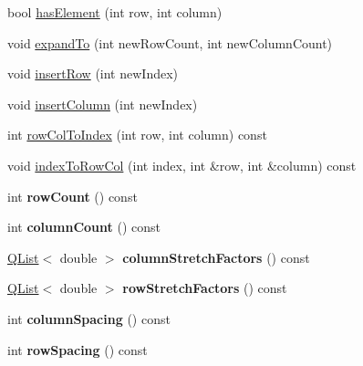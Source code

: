 \begin{DoxyCompactItemize}
\item 
bool \hyperlink{class_q_c_p_layout_grid_ab0cf4f7edc9414a3bfaddac0f46dc0a0}{has\+Element} (int row, int column)
\item 
void \hyperlink{class_q_c_p_layout_grid_a886c0dcbabd51a45da399e044552b685}{expand\+To} (int new\+Row\+Count, int new\+Column\+Count)
\item 
void \hyperlink{class_q_c_p_layout_grid_a48af3dd7c3a653d9c3d7dd99bd02e838}{insert\+Row} (int new\+Index)
\item 
void \hyperlink{class_q_c_p_layout_grid_a1e880a321dbe8b43b471ccd764433dc4}{insert\+Column} (int new\+Index)
\item 
int \hyperlink{class_q_c_p_layout_grid_a3cefc5fe391722b653958ab6e984c706}{row\+Col\+To\+Index} (int row, int column) const 
\item 
void \hyperlink{class_q_c_p_layout_grid_a964d4e6284af1cfc4da0292c2e0b5ac0}{index\+To\+Row\+Col} (int index, int \&row, int \&column) const 
\item 
int {\bfseries row\+Count} () const \hypertarget{class_q_c_p_layout_grid_af8e6c7a05864ebe610c87756c7b9079c}{}\label{class_q_c_p_layout_grid_af8e6c7a05864ebe610c87756c7b9079c}

\item 
int {\bfseries column\+Count} () const \hypertarget{class_q_c_p_layout_grid_ac39074eafd148b82d0762090f258189e}{}\label{class_q_c_p_layout_grid_ac39074eafd148b82d0762090f258189e}

\item 
\hyperlink{class_q_list}{Q\+List}$<$ double $>$ {\bfseries column\+Stretch\+Factors} () const \hypertarget{class_q_c_p_layout_grid_a39bd7994d00687d1b9defef6f1bda835}{}\label{class_q_c_p_layout_grid_a39bd7994d00687d1b9defef6f1bda835}

\item 
\hyperlink{class_q_list}{Q\+List}$<$ double $>$ {\bfseries row\+Stretch\+Factors} () const \hypertarget{class_q_c_p_layout_grid_a3744496abf73c8e3b464181d63bb20a7}{}\label{class_q_c_p_layout_grid_a3744496abf73c8e3b464181d63bb20a7}

\item 
int {\bfseries column\+Spacing} () const \hypertarget{class_q_c_p_layout_grid_a3de19753fdca81194458cb15156f7315}{}\label{class_q_c_p_layout_grid_a3de19753fdca81194458cb15156f7315}

\item 
int {\bfseries row\+Spacing} () const \hypertarget{class_q_c_p_layout_grid_abccdd33c1b284feb6df90fa02f23d9a3}{}\label{class_q_c_p_layout_grid_abccdd33c1b284feb6df90fa02f23d9a3}


\end{DoxyCompactItemize}
